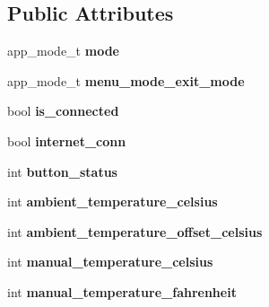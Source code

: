 \subsection*{Public Attributes}
\begin{DoxyCompactItemize}
\item 
app\+\_\+mode\+\_\+t {\bfseries mode}\hypertarget{structapp__data__t_aee8a3cb0789b2d289c16a1e879e9ce79}{}\label{structapp__data__t_aee8a3cb0789b2d289c16a1e879e9ce79}

\item 
app\+\_\+mode\+\_\+t {\bfseries menu\+\_\+mode\+\_\+exit\+\_\+mode}\hypertarget{structapp__data__t_aa0be9d74bb8bd905acb9d0a25d55df74}{}\label{structapp__data__t_aa0be9d74bb8bd905acb9d0a25d55df74}

\item 
bool {\bfseries is\+\_\+connected}\hypertarget{structapp__data__t_a6da33944ebe7f366efe9f33eb04d8f36}{}\label{structapp__data__t_a6da33944ebe7f366efe9f33eb04d8f36}

\item 
bool {\bfseries internet\+\_\+conn}\hypertarget{structapp__data__t_a55a1d02be081e0313496ac172a991957}{}\label{structapp__data__t_a55a1d02be081e0313496ac172a991957}

\item 
int {\bfseries button\+\_\+status}\hypertarget{structapp__data__t_a09c8e3c05e204b38e846dda7dc321c82}{}\label{structapp__data__t_a09c8e3c05e204b38e846dda7dc321c82}

\item 
int {\bfseries ambient\+\_\+temperature\+\_\+celsius}\hypertarget{structapp__data__t_ac937aba852219bd9afd5356e9aa2c1ed}{}\label{structapp__data__t_ac937aba852219bd9afd5356e9aa2c1ed}

\item 
int {\bfseries ambient\+\_\+temperature\+\_\+offset\+\_\+celsius}\hypertarget{structapp__data__t_a93b822695e372d0028092e7599bb825a}{}\label{structapp__data__t_a93b822695e372d0028092e7599bb825a}

\item 
int {\bfseries manual\+\_\+temperature\+\_\+celsius}\hypertarget{structapp__data__t_ad4b95bef8c4034d97c588b5dc4a0a96d}{}\label{structapp__data__t_ad4b95bef8c4034d97c588b5dc4a0a96d}

\item 
int {\bfseries manual\+\_\+temperature\+\_\+fahrenheit}\hypertarget{structapp__data__t_a25ed18f5ce48f0237c443ba9bd4447f3}{}\label{structapp__data__t_a25ed18f5ce48f0237c443ba9bd4447f3}


\end{DoxyCompactItemize}
